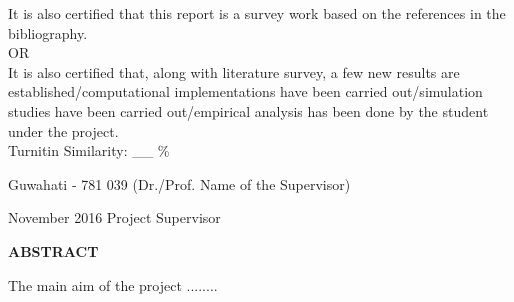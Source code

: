\documentclass[12pt,a4paper]{report}
\theoremstyle{plain}
\theoremstyle{definition}
\theoremstyle{remark}
\begin{document}
\noindent
It is also certified that this report is a survey work based on the references
in the bibliography.\\

OR\\

\noindent
It is also certified that, along with literature survey,
a few new results are established/computational implementations have been carried
out/simulation studies have been carried out/empirical analysis
has been done by the student under the project.\\

\noindent
Turnitin Similarity: \_\_ \%
%

\vspace{4cm}

\noindent Guwahati - 781 039 \hfill (Dr./Prof. Name of the Supervisor)

\noindent November 2016 \hfill Project Supervisor

\clearpage

\begin{center}
{\Large{\bf{ABSTRACT}}}
\end{center}


The main aim of the project ........

\clearpage



\tableofcontents
\clearpage
\listoffigures
\listoftables


\newpage

\setcounter{page}{1}









\nocite{golub} \nocite{gerla}\nocite{m1}\nocite{chang}



\end{document}

